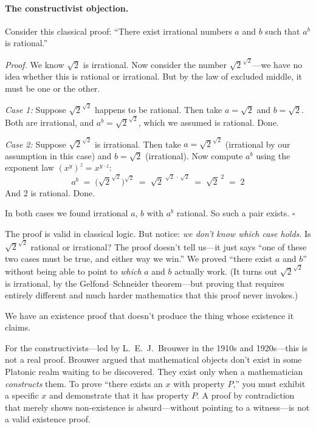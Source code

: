 \documentclass[11pt,a4paper]{article}
\theoremstyle{definition}
\begin{document}
\paragraph{The constructivist objection.}
Consider this classical proof: ``There exist irrational numbers $a$ and $b$
such that $a^b$ is rational.''

\emph{Proof.} We know $\sqrt{2}$ is irrational. Now consider the number
$\sqrt{2}^{\sqrt{2}}$---we have no idea whether this is rational or irrational.
But by the law of excluded middle, it must be one or the other.

\emph{Case 1:} Suppose $\sqrt{2}^{\sqrt{2}}$ happens to be rational.
Then take $a = \sqrt{2}$ and $b = \sqrt{2}$. Both are irrational, and
$a^b = \sqrt{2}^{\sqrt{2}}$, which we assumed is rational. Done.

\emph{Case 2:} Suppose $\sqrt{2}^{\sqrt{2}}$ is irrational.
Then take $a = \sqrt{2}^{\sqrt{2}}$ (irrational by our assumption in this case)
and $b = \sqrt{2}$ (irrational). Now compute $a^b$ using the exponent law
$(x^y)^z = x^{y \cdot z}$:
\[
  a^b \;=\; \bigl(\sqrt{2}^{\sqrt{2}}\bigr)^{\sqrt{2}}
      \;=\; \sqrt{2}^{\;\sqrt{2}\,\cdot\,\sqrt{2}}
      \;=\; \sqrt{2}^{\;2}
      \;=\; 2
\]
And $2$ is rational. Done.

In both cases we found irrational $a$, $b$ with $a^b$ rational. So such a
pair exists. $\square$

The proof is valid in classical logic. But notice: \emph{we don't know which
case holds}. Is $\sqrt{2}^{\sqrt{2}}$ rational or irrational? The proof doesn't
tell us---it just says ``one of these two cases must be true, and either way
we win.'' We proved ``there exist $a$ and $b$'' without being able to point to
\emph{which} $a$ and $b$ actually work. (It turns out $\sqrt{2}^{\sqrt{2}}$ is
irrational, by the Gelfond--Schneider theorem---but proving that requires
entirely different and much harder mathematics that this proof never invokes.)

We have an existence proof that doesn't produce the thing whose existence it
claims.

For the constructivists---led by L.~E.~J.\ Brouwer in the 1910s and 1920s---this
is not a real proof. Brouwer argued that mathematical objects don't exist in
some Platonic realm waiting to be discovered. They exist only when a
mathematician \emph{constructs} them. To prove ``there exists an $x$ with
property $P$,'' you must exhibit a specific $x$ and demonstrate that it has
property $P$. A proof by contradiction that merely shows non-existence is
absurd---without pointing to a witness---is not a valid existence proof.
\end{document}
